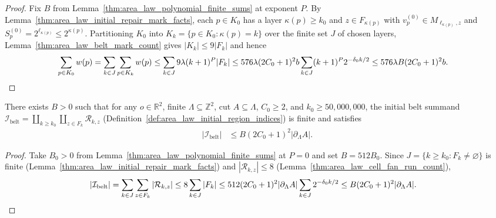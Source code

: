 \begin{proof}
    \leanok
    Fix $B$ from Lemma~\ref{thm:area_law_polynomial_finite_sums} at exponent $P$. By
    Lemma~\ref{thm:area_law_initial_repair_mark_facts}, each $p\in K_0$ has a layer
    $\kappa(p)\ge k_0$ and $z\in F_{\kappa(p)}$ with $v_p^{(0)}\in M_{\ell_{\kappa(p)},z}$ and
    $S_p^{(0)}=2^{\ell_{\kappa(p)}}\le2^{\kappa(p)}$. Partitioning $K_0$ into
    $K_k=\{p\in K_0:\kappa(p)=k\}$ over the finite set $J$ of chosen layers,
    Lemma~\ref{thm:area_law_belt_mark_count} gives $|K_k|\le9|F_k|$ and hence
    \begin{align}
        \sum_{p\in K_0}w(p)
         & =\sum_{k\in J}\sum_{p\in K_k}w(p)
        \le\sum_{k\in J}9\lambda(k+1)^P|F_k|
        \le576\lambda(2C_0+1)^2b\sum_{k\in J}(k+1)^P2^{-\delta_0 k/2}
        \le576\lambda B(2C_0+1)^2b.\notag
    \end{align}
\end{proof}

\begin{lemma}
    \label{thm:area_law_initial_belt_count}
    \leanok
    There exists $B>0$ such that for any $o\in\mathbb R^2$, finite $\Lambda\subseteq\mathbb Z^2$,
    cut $A\subseteq\Lambda$, $C_0\ge2$, and $k_0\ge50{,}000{,}000$, the initial belt summand
    $\mathcal I_{\mathrm{belt}}=\coprod_{k\ge k_0}\coprod_{z\in F_k}\mathcal R_{k,z}$
    (Definition~\ref{def:area_law_initial_region_indices}) is finite and satisfies
    \begin{align}
        |\mathcal I_{\mathrm{belt}}|
         & \le B(2C_0+1)^2|\partial_\Lambda A|.
        \label{eq:area_law_initial_belt_count}
    \end{align}
\end{lemma}

\begin{proof}
    \leanok
    Take $B_0>0$ from Lemma~\ref{thm:area_law_polynomial_finite_sums} at $P=0$ and set $B=512B_0$.
    Since $J=\{k\ge k_0:F_k\ne\varnothing\}$ is finite
    (Lemma~\ref{thm:area_law_initial_repair_mark_facts}) and $|\mathcal R_{k,z}|\le8$
    (Lemma~\ref{thm:area_law_cell_fan_run_count}),
    \begin{align}
        |\mathcal I_{\mathrm{belt}}|
         & =\sum_{k\in J}\sum_{z\in F_k}|\mathcal R_{k,z}|
        \le8\sum_{k\in J}|F_k|
        \le512(2C_0+1)^2|\partial_\Lambda A|\sum_{k\in J}2^{-\delta_0 k/2}
        \le B(2C_0+1)^2|\partial_\Lambda A|.\notag
    \end{align}
\end{proof}

